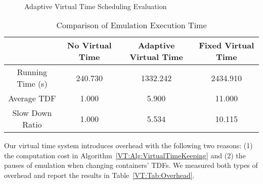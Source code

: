 \begin{figure}
    \centering
    \\
    \caption{Adaptive Virtual Time Scheduling Evaluation}
    \label{VT:Fig:Adaptive}
\end{figure}

\begin{table*}
    \centering
    \caption{Comparison of Emulation Execution Time}
    \begin{tabular}{c|c|c|c} 
        \hline
        & No Virtual Time & Adaptive Virtual Time & Fixed Virtual Time \\ 
        \hline
        \hline
        Running Time (s)  & 240.730 & 1332.242 & 2434.910 \\ 
        \hline
        Average TDF & 1.000 & 5.900 & 11.000 \\ 
        \hline
        Slow Down Ratio & 1.000 & 5.534 & 10.115 \\
        \hline
    \end{tabular}
    \label{VT:Tab:CompareRunTime}
\end{table*}

Our virtual time system introduces overhead with the following two reasons:
(1) the computation cost in Algorithm~\ref{VT:Alg:VirtualTimeKeeping} and
(2) the pauses of emulation when changing containers' TDFs.
We measured both types of overhead and report the results in Table~\ref{VT:Tab:Overhead}.

